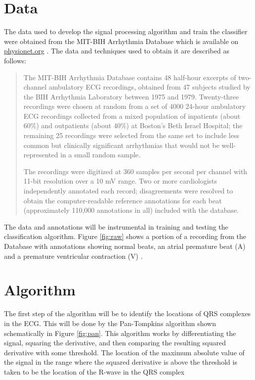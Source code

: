 \documentclass[titlepage,12pt,letter]{article}
\begin{document}
\section{Data}
The data used to develop the signal processing algorithm and train the
classifier were obtained from the MIT-BIH Arrhythmia Database which is available
on \href{http://physionet.org/physiobank/database/mitdb/}{physionet.org}
\cite{MIT-BIH} \nocite{physionet}.  The data and techniques used to obtain it
are described as follows: 
\begin{quotation}
     The MIT-BIH Arrhythmia Database contains 48 half-hour excerpts of
     two-channel ambulatory ECG recordings, obtained from 47 subjects studied by
     the BIH Arrhythmia Laboratory between 1975 and 1979. Twenty-three
     recordings were chosen at random from a set of 4000 24-hour ambulatory ECG
     recordings collected from a mixed population of inpatients (about 60\%) and
     outpatients (about 40\%) at Boston's Beth Israel Hospital; the remaining 25
     recordings were selected from the same set to include less common but
     clinically significant arrhythmias that would not be well-represented in a
     small random sample.

     The recordings were digitized at 360 samples per second per channel with
     11-bit resolution over a 10 mV range. Two or more cardiologists
     independently annotated each record; disagreements were resolved to obtain
     the computer-readable reference annotations for each beat (approximately
     110,000 annotations in all) included with the database.
\end{quotation}

The data and annotations will be instrumental in training and testing the
classification algorithm.  Figure \ref{fig:raw} shows a portion of a recording
from the Database with annotations showing normal beats, an atrial premature
beat (A) and a premature ventricular contraction (V) \cite{MIT-BIH}.  

\section{Algorithm}
The first step of the algorithm will be to identify the locations of QRS
complexes in the ECG.  This will be done by the Pan-Tompkins algorithm shown
schematically in Figure \ref{fig:pan}.  This algorithm works by differentiating
the signal, squaring the derivative, and then comparing the resulting squared
derivative with some threshold.  The location of the maximum absolute value of
the signal in the range where the squared derivative is above the threshold is
taken to be the location of the R-wave in the QRS complex \cite{pan-tompkins85}
\end{document}
